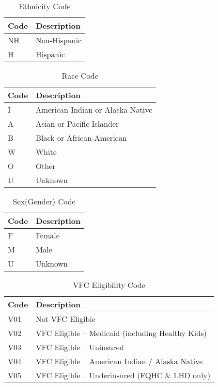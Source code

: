 \documentclass{article}
\begin{document}
\begin{table}
\centering
\begin{tabular}{ll}
\toprule
\textbf{Code} & \textbf{Description} \\ \midrule
NH   & Non-Hispanic \\ 
H    & Hispanic     \\ 
\bottomrule
\end{tabular}
\caption{Ethnicity Code}
\label{tab:EthnicityCode}
\end{table}


\begin{table}
\centering
\begin{tabular}{ll}
\toprule
\textbf{Code} & \textbf{Description}             \\ \midrule
I             & American Indian or Alaska Native \\ 
A             & Asian or Pacific Islander        \\ 
B             & Black  or African-American       \\ 
W             & White                            \\ 
O             & Other                            \\ 
U             & Unknown                          \\ 
\bottomrule
\end{tabular}
\caption{Race Code}
\label{tab:RaceCode}
\end{table}

\begin{table}
\centering
\begin{tabular}{ll}
\toprule
\textbf{Code} & \textbf{Description} \\ \midrule
F             & Female               \\ 
M             & Male                 \\ 
U             & Unknown              \\ 
\bottomrule
\end{tabular}
\caption{Sex(Gender) Code}
\label{tab:SexCode}
\end{table}

\begin{table}
\centering
\begin{tabular}{ll}
\toprule
\textbf{Code} & \textbf{Description}                             \\ \midrule
V01           & Not VFC Eligible                                 \\
V02           & VFC Eligible – Medicaid (including Healthy Kids) \\ 
V03           & VFC Eligible – Uninsured                         \\ 
V04           & VFC Eligible – American Indian / Alaska Native   \\ 
V05           & VFC Eligible – Underinsured (FQHC \& LHD only)   \\ 
\bottomrule
\end{tabular}
\caption{VFC Eligibility Code}
\label{tab:VFCCode}
\end{table}
\end{document}
